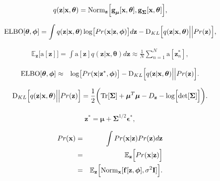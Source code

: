 \documentclass[letterpaper,twoside,openany, titlepage,oldfontcommands,titles,dvipsnames]{memoir}
\begin{document}
\begin{eqnarray}\label{eq:vae_posterior_pred}
  q(\mathbf{z}|\mathbf{x},\boldsymbol\theta) = \mbox{Norm}_{\mathbf{z}}\Bigl[\mbox{\bf g}_{\boldsymbol\mu}[\mathbf{x},\boldsymbol\theta], \mbox{\bf g}_{\boldsymbol\Sigma}[\mathbf{x},\boldsymbol\theta]\Bigr],
 \end{eqnarray}

\begin{eqnarray}\label{eq:vae_VAECrit}
 \mbox{ELBO}[\boldsymbol\theta, \boldsymbol\phi] 
  = \int q(\mathbf{z}|\mathbf{x},\boldsymbol\theta) \log\bigl[ Pr(\mathbf{x}|\mathbf{z},\boldsymbol\phi) \bigr]d\mathbf{z}
 - \mbox{D}_{KL}\Bigl[ q(\mathbf{z}|\mathbf{x},\boldsymbol\theta)\Bigl|\Bigr|Pr(\mathbf{z})\Bigr],
 \end{eqnarray}

\begin{eqnarray}\label{eq:VAE_approx_expectation}
 \mathbb{E}_{\mathbf{z}}\bigl[\mbox{a}[\mathbf{z}]\bigr] = \int \mbox{a}[\mathbf{z}] q(\mathbf{z}|\mathbf{x},\boldsymbol\theta) d\mathbf{z} \approx \frac{1}{N}\sum_{n=1}^{N}\mbox{a}[\mathbf{z}^{*}_n],
 \end{eqnarray}

\begin{eqnarray}\label{eq:vae_ELBO_Sample}
 \mbox{ELBO}[\boldsymbol\theta, \boldsymbol\phi] &\approx& \log\bigl[ Pr(\mathbf{x}|\mathbf{z}^{*},\boldsymbol\phi) \bigr]- \mbox{D}_{KL}\Bigl[ q(\mathbf{z}|\mathbf{x},\boldsymbol\theta)\Bigl|\Bigr|Pr(\mathbf{z})\Bigr].
 \end{eqnarray}

\begin{eqnarray}
  \mbox{D}_{KL}\Bigl[ q(\mathbf{z}|\mathbf{x},\boldsymbol\theta)\Bigl|\Bigr|Pr(\mathbf{z})\Bigr] = \frac{1}{2}\biggl(\mbox{Tr}[\boldsymbol\Sigma] + \boldsymbol\mu^T\boldsymbol\mu - D_{\mathbf{z}} - \log\Bigl[\mbox{det}[\boldsymbol\Sigma]\Bigr]\biggr).
 \end{eqnarray}

\begin{eqnarray}
  \mathbf{z}^{*} = \boldsymbol\mu + \boldsymbol\Sigma^{1/2}\boldsymbol\epsilon^{*},
 \end{eqnarray}

\begin{eqnarray}
 Pr(\mathbf{x}) &=& \int Pr(\mathbf{x}|\mathbf{z}) Pr(\mathbf{z})d\mathbf{z}\nonumber\\
 &=& \mathbb{E}_{\mathbf{z}} \Bigl[Pr(\mathbf{x}|\mathbf{z}) \Bigr] \nonumber \\
 &=& \mathbb{E}_{\mathbf{z}}\Bigl[\mbox{Norm}_{\mathbf{x}}[\mathbf{f}[\mathbf{z},\boldsymbol\phi],\sigma^{2}\mathbf{I}]\Bigr].
 \end{eqnarray}
\end{document}
